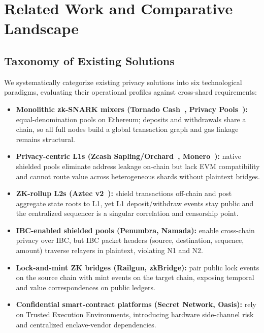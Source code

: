 \documentclass[sigconf,nonacm]{acmart}
\begin{document}
\section{Related Work and Comparative Landscape}

\subsection{Taxonomy of Existing Solutions}
We systematically categorize existing privacy solutions into six technological paradigms, evaluating their operational profiles against cross-shard requirements:

\begin{itemize}
    \item \textbf{Monolithic zk-SNARK mixers (Tornado Cash~\cite{pertsev2019tornado}, Privacy Pools~\cite{buterin2023blockchain}):} equal-denomination pools on Ethereum; deposits and withdrawals share a chain, so all full nodes build a global transaction graph and gas linkage remains structural.
    \item \textbf{Privacy-centric L1s (Zcash Sapling/Orchard~\cite{hopwood2016zcash}, Monero~\cite{noether2016ringct}):} native shielded pools eliminate address leakage on-chain but lack EVM compatibility and cannot route value across heterogeneous shards without plaintext bridges.
    \item \textbf{ZK-rollup L2s (Aztec v2~\cite{aztec2022}):} shield transactions off-chain and post aggregate state roots to L1, yet L1 deposit/withdraw events stay public and the centralized sequencer is a singular correlation and censorship point.
    \item \textbf{IBC-enabled shielded pools (Penumbra, Namada):} enable cross-chain privacy over IBC, but IBC packet headers (source, destination, sequence, amount) traverse relayers in plaintext, violating N1 and N2.
    \item \textbf{Lock-and-mint ZK bridges (Railgun, zkBridge):} pair public lock events on the source chain with mint events on the target chain, exposing temporal and value correspondences on public ledgers.
    \item \textbf{Confidential smart-contract platforms (Secret Network, Oasis):} rely on Trusted Execution Environments, introducing hardware side-channel risk and centralized enclave-vendor dependencies.
\end{itemize}
\end{document}
